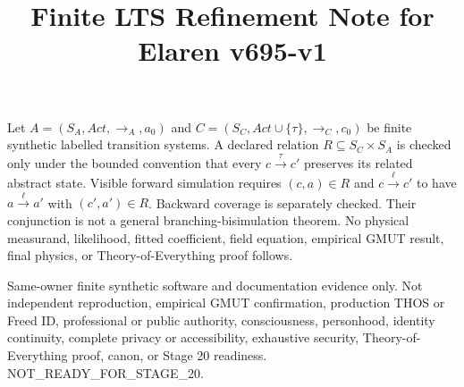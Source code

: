 \documentclass{article}
\title{Finite LTS Refinement Note for Elaren v695-v1}
\begin{document}
\maketitle
Let $A=(S_A,Act,\to_A,a_0)$ and $C=(S_C,Act\cup\{\tau\},\to_C,c_0)$ be finite synthetic labelled transition systems. A declared relation $R\subseteq S_C\times S_A$ is checked only under the bounded convention that every $c\xrightarrow{\tau}c' $ preserves its related abstract state. Visible forward simulation requires $(c,a)\in R$ and $c\xrightarrow{\ell}c'$ to have $a\xrightarrow{\ell}a'$ with $(c',a')\in R$. Backward coverage is separately checked. Their conjunction is not a general branching-bisimulation theorem. No physical measurand, likelihood, fitted coefficient, field equation, empirical GMUT result, final physics, or Theory-of-Everything proof follows.\par
Same-owner finite synthetic software and documentation evidence only. Not independent reproduction, empirical GMUT confirmation, production THOS or Freed ID, professional or public authority, consciousness, personhood, identity continuity, complete privacy or accessibility, exhaustive security, Theory-of-Everything proof, canon, or Stage 20 readiness. NOT\_READY\_FOR\_STAGE\_20.
\end{document}

